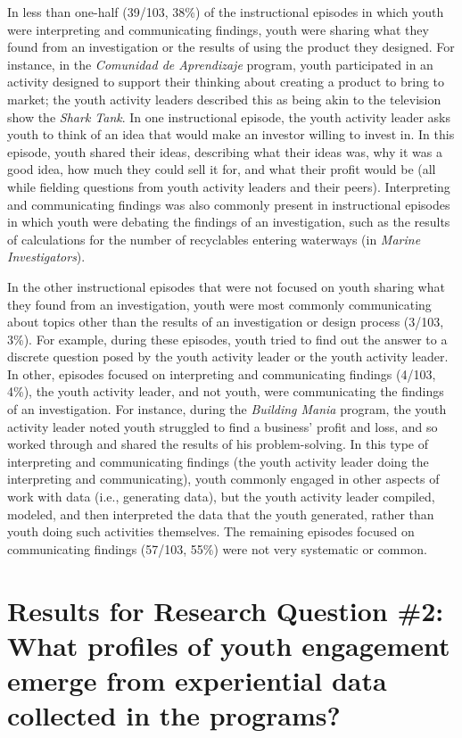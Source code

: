 \documentclass[]{msu-thesis}
\theoremstyle{definition}
\theoremstyle{definition}
\theoremstyle{definition}
\theoremstyle{remark}
\begin{document}
In less than one-half (39/103, 38\%) of the instructional episodes in
which youth were interpreting and communicating findings, youth were
sharing what they found from an investigation or the results of using
the product they designed. For instance, in the \emph{Comunidad de
Aprendizaje} program, youth participated in an activity designed to
support their thinking about creating a product to bring to market; the
youth activity leaders described this as being akin to the television
show the \emph{Shark Tank}. In one instructional episode, the youth
activity leader asks youth to think of an idea that would make an
investor willing to invest in. In this episode, youth shared their
ideas, describing what their ideas was, why it was a good idea, how much
they could sell it for, and what their profit would be (all while
fielding questions from youth activity leaders and their peers).
Interpreting and communicating findings was also commonly present in
instructional episodes in which youth were debating the findings of an
investigation, such as the results of calculations for the number of
recyclables entering waterways (in \emph{Marine Investigators}).

In the other instructional episodes that were not focused on youth
sharing what they found from an investigation, youth were most commonly
communicating about topics other than the results of an investigation or
design process (3/103, 3\%). For example, during these episodes, youth
tried to find out the answer to a discrete question posed by the youth
activity leader or the youth activity leader. In other, episodes focused
on interpreting and communicating findings (4/103, 4\%), the youth
activity leader, and not youth, were communicating the findings of an
investigation. For instance, during the \emph{Building Mania} program,
the youth activity leader noted youth struggled to find a business'
profit and loss, and so worked through and shared the results of his
problem-solving. In this type of interpreting and communicating findings
(the youth activity leader doing the interpreting and communicating),
youth commonly engaged in other aspects of work with data (i.e.,
generating data), but the youth activity leader compiled, modeled, and
then interpreted the data that the youth generated, rather than youth
doing such activities themselves. The remaining episodes focused on
communicating findings (57/103, 55\%) were not very systematic or
common.

\section{Results for Research Question \#2: What profiles of youth
engagement emerge from experiential data collected in the
programs?}\label{results-for-research-question-2-what-profiles-of-youth-engagement-emerge-from-experiential-data-collected-in-the-programs}
\end{document}
